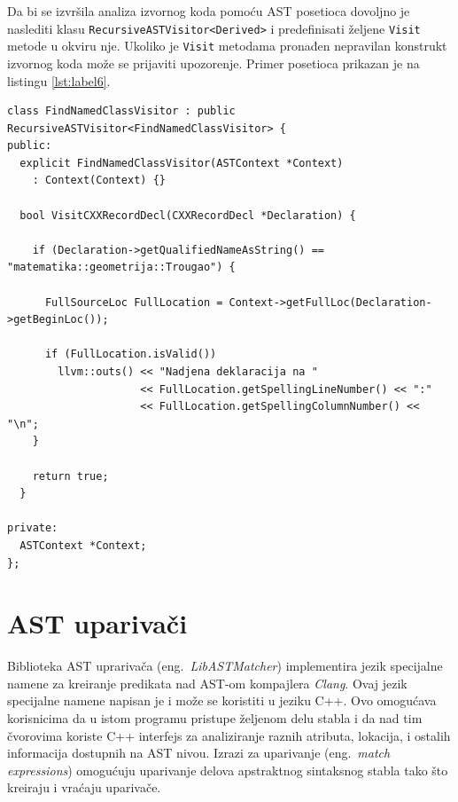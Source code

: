 \documentclass[12pt,oneside]{memoir}
\begin{document}
\par
Da bi se izvršila analiza izvornog koda pomoću AST posetioca dovoljno je naslediti klasu 
 \texttt{RecursiveASTVisitor<Derived>} i predefinisati željene \texttt{Visit} metode u okviru nje. Ukoliko je \texttt{Visit} metodama pronađen nepravilan konstrukt izvornog koda mo\v{z}e se prijaviti upozorenje. Primer posetioca prikazan je na listingu \ref{lst:label6}.

\begin{lstlisting}[style=customc, basicstyle=\tiny, caption={Primer posetioaca koji pose\'{c}uje sve strukture, unije i klase i ispisuje lokaciju onih \v{c}iji naziv je \texttt{matematika::geometrija::Trougao}.},label=lst:label6]
class FindNamedClassVisitor : public RecursiveASTVisitor<FindNamedClassVisitor> {
public:
  explicit FindNamedClassVisitor(ASTContext *Context)
    : Context(Context) {}

  bool VisitCXXRecordDecl(CXXRecordDecl *Declaration) {

    if (Declaration->getQualifiedNameAsString() == "matematika::geometrija::Trougao") {

      FullSourceLoc FullLocation = Context->getFullLoc(Declaration->getBeginLoc());

      if (FullLocation.isValid())
        llvm::outs() << "Nadjena deklaracija na "
                     << FullLocation.getSpellingLineNumber() << ":"
                     << FullLocation.getSpellingColumnNumber() << "\n";
    }

    return true;
  }

private:
  ASTContext *Context;
};
\end{lstlisting}


\section{AST upariva\v{c}i}

Biblioteka AST uprariva\v{c}a (eng.~\textit{LibASTMatcher}) implementira jezik specijalne namene za kreiranje predikata nad AST-om kompajlera \textit{Clang}. Ovaj jezik specijalne namene napisan je i može se koristiti u jeziku C++. Ovo omogućava korisnicima da u istom programu pristupe željenom delu stabla i da nad tim čvorovima koriste C++ interfejs za analiziranje raznih atributa, lokacija, i ostalih informacija dostupnih na AST nivou. Izrazi za uparivanje (eng.~\textit{match expressions}) omogu\'{c}uju uparivanje delova apstraktnog sintaksnog stabla tako \v{s}to kreiraju i vra\'{c}aju upariva\v{c}e.
\end{document}

